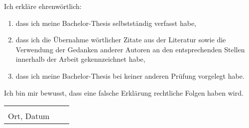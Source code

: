 \documentclass[../main.tex]{subfiles}
\begin{document}
\thispagestyle{empty}

Ich erkläre ehrenwörtlich:
\begin{enumerate}
	\item dass ich meine Bachelor-Thesis selbstständig verfasst habe,
	\item dass ich die Übernahme wörtlicher Zitate aus der Literatur sowie die Verwendung der Gedanken anderer Autoren an den entsprechenden Stellen innerhalb der Arbeit gekennzeichnet habe,
	\item dass ich meine Bachelor-Thesis bei keiner anderen Prüfung vorgelegt habe.
\end{enumerate}
Ich bin mir bewusst, dass eine falsche Erklärung rechtliche Folgen haben wird.
\vspace{2cm}

\begin{tabular}{lp{4em}l} 
	\hspace{5cm}   && \hspace{4cm} \\\cline{1-1}\cline{3-3} 
	Ort, Datum     && \studentName{}
\end{tabular}
\end{document}
